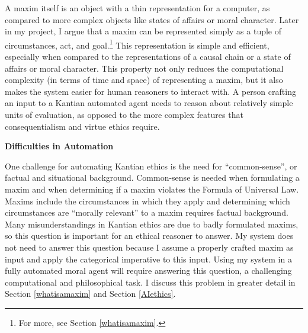 \begin{isabellebody}
\begin{isamarkuptext}
A maxim itself is an object with a thin representation for a computer, as compared to more complex 
objects like states of affairs or moral character. Later in my project, I argue that a maxim can be 
represented simply as a tuple of circumstances, act, and goal.\footnote{For more, see Section \ref{whatisamaxim}.} 
This representation is simple and efficient, especially when compared to the representations of a causal 
chain or a state of affairs or moral character. This property not only reduces the computational complexity
(in terms of time and space) of representing a maxim, but it also makes the system easier for human reasoners
to interact with. A person crafting an input to a Kantian automated agent needs to reason about relatively
simple units of evaluation, as opposed to the more complex features that consequentialism and virtue
ethics require.%
\end{isamarkuptext}\isamarkuptrue%
%
\begin{isamarkuptext}%
\noindent \textbf{Difficulties in Automation}%
\end{isamarkuptext}\isamarkuptrue%
%
\begin{isamarkuptext}%
One challenge for automating Kantian ethics is the need for ``common-sense'', or factual and 
situational background. Common-sense is needed when formulating a maxim and when determining if a maxim 
violates the Formula of Universal Law. Maxims include the circumstances in which they apply and
determining which circumstances are ``morally relevant'' to a maxim requires factual background. 
Many misunderstandings in Kantian ethics are due to badly formulated maxims, so this question is 
important for an ethical reasoner to answer. My system does not need to answer this question because I assume a properly crafted
maxim as input and apply the categorical imperative to this input. Using my system in a fully automated
moral agent will require answering this question, a challenging computational and philosophical task. I
discuss this problem in greater detail in Section \ref{whatisamaxim} and Section \ref{AIethics}. 


\end{isamarkuptext}
\end{isabellebody}
